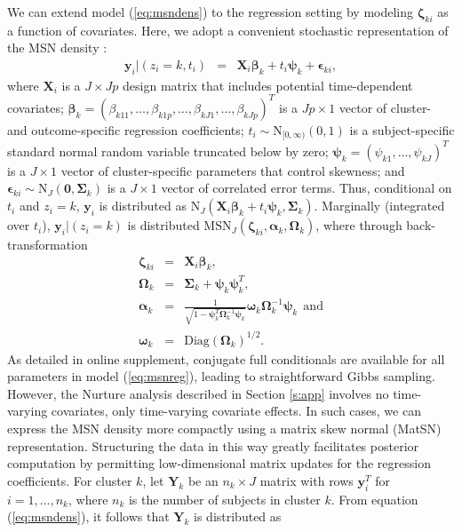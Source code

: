 \documentclass[useAMS,usenatbib,referee]{biom}
\begin{document}
We can extend model (\ref{eq:msndens}) to the regression setting by modeling $\boldsymbol\zeta_{ki}$ as a function of covariates. Here, we adopt a convenient stochastic representation of the MSN density \citep{azzalini1996multivariate, fruhwirth2010bayesian}:
\begin{eqnarray}
\mathbf{y}_{i}|(z_i=k,t_i) &=& \mathbf{X}_i \boldsymbol\beta_k + t_i \boldsymbol\psi_k + \boldsymbol\epsilon_{ki}, \label{eq:msnreg}
\end{eqnarray}
where $\mathbf{X}_i$ is a $J \times Jp$ design matrix that includes potential time-dependent covariates; $\boldsymbol{\beta}_k=(\beta_{k11},\ldots,\beta_{k1p},\ldots,\beta_{kJ1},\ldots,\beta_{kJp})^T$ is a $Jp\times 1$ vector of cluster- and outcome-specific regression coefficients; $t_i\sim \text{N}_{[0,\infty)}(0,1)$ is a subject-specific standard normal random variable truncated below by zero; $\boldsymbol\psi_k=(\psi_{k1},\ldots,\psi_{kJ})^T$ is a $J \times 1$ vector of cluster-specific parameters that control skewness; and $\boldsymbol{\epsilon}_{ki} \sim \text{N}_J(\boldsymbol0,\boldsymbol\Sigma_k)$ is a $J\times 1$ vector of correlated error terms. Thus, conditional on $t_i$ and $z_i=k$, $\boldsymbol{y}_i$ is distributed as $\text{N}_J(\mathbf{X}_i \boldsymbol\beta_k + t_i \boldsymbol\psi_k, \boldsymbol{\Sigma}_k)$. Marginally (integrated over $t_i$), $\mathbf{y}_i|(z_i = k)$ is distributed $\text{MSN}_J(\boldsymbol\zeta_{ki}, \boldsymbol\alpha_k, \boldsymbol\Omega_k)$, where through back-transformation
\begin{eqnarray}
\label{eq:backtrans}
\boldsymbol\zeta_{ki} &=& \mathbf{X}_i\boldsymbol\beta_k, \nonumber \\
\boldsymbol\Omega_k &=& \boldsymbol\Sigma_k  + \boldsymbol\psi_k \boldsymbol\psi_k^T,\label{eq:back_transform}\\
\boldsymbol\alpha_k &=& \frac{1}{\sqrt{1 - \boldsymbol\psi_k^T
\boldsymbol\Omega^{-1}_k\boldsymbol\psi_k}} \boldsymbol\omega_k \boldsymbol\Omega^{-1}_k\boldsymbol\psi_k~~\text{and}\nonumber\\
 \boldsymbol\omega_k &=& \text{Diag}(\boldsymbol\Omega_k)^{1/2}.\nonumber
\end{eqnarray}
As detailed in online supplement, conjugate full conditionals are available for all parameters in model (\ref{eq:msnreg}), leading to straightforward Gibbs sampling. However, the Nurture analysis described in Section \ref{s:app} involves no time-varying covariates, only time-varying covariate effects. In such cases, we can express the MSN density more compactly using a matrix skew normal (MatSN) representation. Structuring the data in this way greatly facilitates posterior computation by permitting low-dimensional matrix updates for the regression coefficients. For cluster $k$, let $\mathbf{Y}_k$ be an ${n_k \times J}$ matrix with rows $\mathbf{y}_i^T$ for $i = 1,...,n_k$, where $n_k$ is the number of subjects in cluster $k$. From equation (\ref{eq:msndens}), it follows that $\mathbf{Y}_k$ is distributed as
\end{document}
